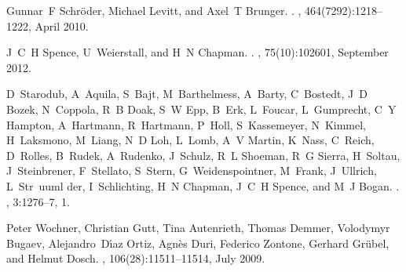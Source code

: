 \documentclass [11pt,fleqn]{article}
\begin{document}
\begin{thebibliography}{10}
Gunnar~F Schr{\"o}der, Michael Levitt, and Axel~T Brunger.
.
, 464(7292):1218--1222, April 2010.

J~C~H Spence, U~Weierstall, and H~N Chapman.
.
, 75(10):102601, September 2012.

D~Starodub, A~Aquila, S~Bajt, M~Barthelmess, A~Barty, C~Bostedt, J~D Bozek,
  N~Coppola, R~B Doak, S~W Epp, B~Erk, L~Foucar, L~Gumprecht, C~Y Hampton,
  A~Hartmann, R~Hartmann, P~Holl, S~Kassemeyer, N~Kimmel, H~Laksmono, M~Liang,
  N~D Loh, L~Lomb, A~V Martin, K~Nass, C~Reich, D~Rolles, B~Rudek, A~Rudenko,
  J~Schulz, R~L Shoeman, R~G Sierra, H~Soltau, J~Steinbrener, F~Stellato,
  S~Stern, G~Weidenspointner, M~Frank, J~Ullrich, L~Str~uuml der,
  I~Schlichting, H~N Chapman, J~C~H Spence, and M~J Bogan.
.
, 3:1276--7, 1.

Peter Wochner, Christian Gutt, Tina Autenrieth, Thomas Demmer, Volodymyr
  Bugaev, Alejandro~D{\'\i}az Ortiz, Agn{\`e}s Duri, Federico Zontone, Gerhard
  Gr{\"u}bel, and Helmut Dosch.
, 106(28):11511--11514, July 2009.

\end{thebibliography}

%
%
\end{document}
